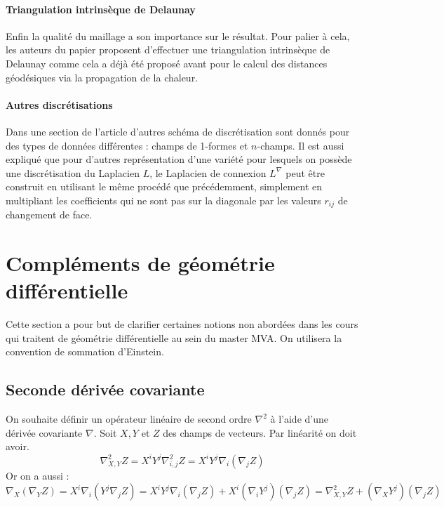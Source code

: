 \documentclass[11pt]{article}
\begin{document}
	\paragraph{Triangulation intrinsèque de Delaunay}
	Enfin la qualité du maillage a son importance sur le résultat. Pour palier à cela, les auteurs du papier proposent d'effectuer une triangulation intrinsèque de Delaunay comme cela a déjà été proposé avant pour le calcul des distances géodésiques via la propagation de la chaleur.

	\paragraph{Autres discrétisations}
	Dans une section de l'article d'autres schéma de discrétisation sont donnés pour des types de données différentes : champs de 1-formes et $n$-champs. Il est aussi expliqué que pour d'autres représentation d'une variété pour lesquels on possède une discrétisation du Laplacien $L$, le Laplacien de connexion $L^\nabla$ peut être construit en utilisant le même procédé que précédemment, simplement en multipliant les coefficients qui ne sont pas sur la diagonale par les valeurs $r_{ij}$ de changement de face.
	
	\appendix
	
	
	
	
	\section{Compléments de géométrie différentielle}
	
	Cette section a pour but de clarifier certaines notions non abordées dans les cours qui traitent de géométrie différentielle au sein du master MVA. On utilisera la convention de sommation d'Einstein.
	
	\subsection{Seconde dérivée covariante}
	
	On souhaite définir un opérateur linéaire de second ordre $\nabla^2$ à l'aide d'une dérivée covariante $\nabla$. Soit $X, Y$ et $Z$ des champs de vecteurs. Par linéarité on doit avoir.
	$$ \nabla_{X, Y}^2 Z = X^i Y^j \nabla_{i, j}^2 Z = X^i Y^j \nabla_i \left( \nabla_j Z \right) $$
	Or on a aussi :
	$$ \nabla_X \left( \nabla_Y Z \right) = X^i \nabla_i \left( Y^j \nabla_j Z \right) = X^i Y^j \nabla_i \left( \nabla_j Z \right) + X^i \left( \nabla_i Y^j \right) \left( \nabla_j Z \right) = \nabla_{X, Y}^2 Z + \left( \nabla_X Y^j \right) \left( \nabla_j Z \right) $$
\end{document}
